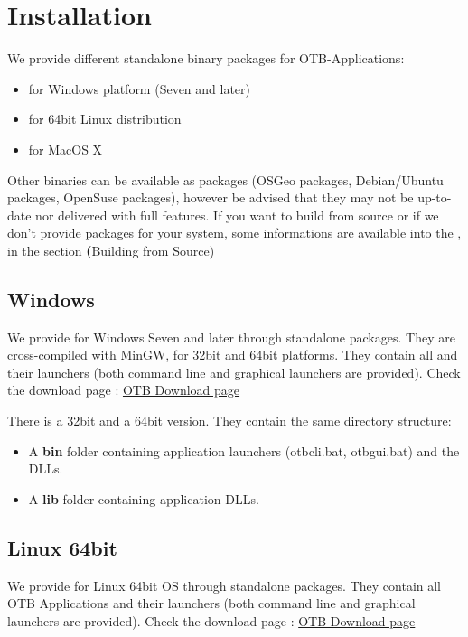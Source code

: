 \section{Installation}\label{sec:appinstall}

We provide different standalone binary packages for OTB-Applications:
\begin{itemize}
\item for Windows platform (Seven and later)
\item for 64bit Linux distribution
\item for MacOS X
\end{itemize}

Other binaries can be available as packages (OSGeo packages, Debian/Ubuntu packages,
OpenSuse packages), however be advised that they may not be up-to-date nor delivered
with full features.
If you want to build from source or if we don't provide packages for your system,
some informations are available into the \sg, in the section \textbf(Building from Source)

\subsection{Windows}

We provide \app for Windows Seven and later through standalone packages.
They are cross-compiled with MinGW, for 32bit and 64bit platforms.
They contain all \app and their launchers (both command line and graphical
launchers are provided). Check the download page :
\href{https://www.orfeo-toolbox.org/download}{OTB Download page}

There is a 32bit and a 64bit version. They contain the same directory structure:
\begin{itemize}
\item A \textbf{bin} folder containing application launchers (otbcli\textunderscore *.bat,
otbgui\textunderscore *.bat) and the DLLs.
\item A \textbf{lib} folder containing application DLLs.
\end{itemize}

\subsection{Linux 64bit}

We provide \app for Linux 64bit OS through standalone packages.
They contain all OTB Applications and their launchers (both command line and graphical
launchers are provided). Check the download page :
\href{https://www.orfeo-toolbox.org/download}{OTB Download page}

